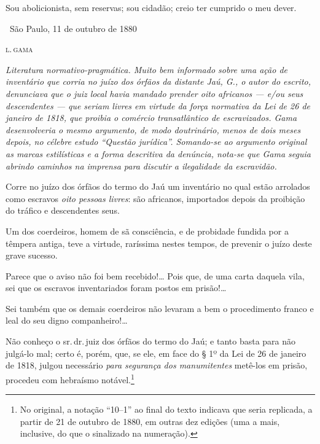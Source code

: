 Sou abolicionista, sem reservas; sou cidadão; creio ter cumprido o meu
dever.

\medskip

\hfill\ São Paulo, 11 de outubro de 1880

\hfill\textsc{l.\,gama}


\begin{resumo}
\emph{Literatura normativo-pragmática. Muito bem informado sobre uma
ação de inventário que corria no juízo dos órfãos da distante Jaú, G., o
autor do escrito, denunciava que o juiz local havia mandado prender oito
africanos --- e/ou seus descendentes --- que seriam livres em virtude da
força normativa da Lei de 26 de janeiro de 1818, que proibia o comércio
transatlântico de escravizados. Gama desenvolveria o mesmo argumento, de
modo doutrinário, menos de dois meses depois, no célebre estudo ``Questão
jurídica''. Somando-se ao argumento original as marcas estilísticas e a
forma descritiva da denúncia, nota-se que Gama seguia abrindo caminhos
na imprensa para discutir a ilegalidade da escravidão. }
\end{resumo}

Corre no juízo dos órfãos do termo do Jaú um inventário no qual estão
arrolados como escravos \emph{oito pessoas livres}: são africanos,
importados depois da proibição do tráfico e descendentes seus.

Um dos coerdeiros, homem de sã consciência, e de probidade fundida por a
têmpera antiga, teve a virtude, raríssima nestes tempos, de prevenir o
juízo deste grave sucesso.

Parece que o aviso não foi bem recebido!\ldots{} Pois que, de uma carta
daquela vila, sei que os escravos inventariados foram postos em
prisão!\ldots{}

Sei também que os demais coerdeiros não levaram a bem o procedimento
franco e leal do seu digno companheiro!\ldots{}

Não conheço o sr.\,dr.\,juiz dos órfãos do termo do Jaú; e tanto basta
para não julgá-lo mal; certo é, porém, que, se ele, em face do § 1º da
Lei de 26 de janeiro de 1818, julgou necessário \emph{para segurança dos
manumitentes} metê-los em prisão, procedeu com hebraísmo notável.\footnote{No original, a notação ``10--1'' ao final do texto indicava que seria replicada, a partir de
  21 de outubro de 1880, em outras dez edições (uma a mais, inclusive, do que o
  sinalizado na numeração).}

